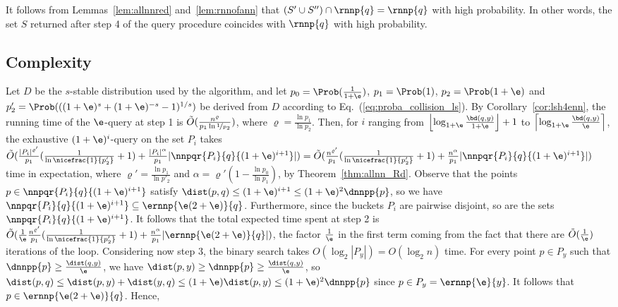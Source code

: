It follows from Lemmas~\ref{lem:allnnred} and~\ref{lem:rnnofann} that
$(S'\cup S'')\cap\rnnp{q}=\rnnp{q}$ with high probability.  In other
words, the set $S$ returned after step 4 of the query procedure
coincides with $\rnnp{q}$ with high probability.

\subsection{Complexity}
\label{rnn_complexity}

Let $D$ be the $s$-stable distribution used by the algorithm, and let
$p_0=\Prob(\frac{1}{1+\e})$, $p_1=\Prob(1)$, $p_2=\Prob(1+\e)$ and
$p'_2=\Prob(((1+\e)^s + (1+\e)^{-s} -1)^{1/s})$ be derived from $D$
according to Eq.~(\ref{eq:proba_collision_ls}). By
Corollary~\ref{cor:lsh4enn}, the running time of the $\e$-\nn query at
step 1 is $\tilde O(\frac{n^{\varrho}}{p_1 \ln \nicefrac{1}{p_2}})$,
where $\varrho = \frac{\ln p_1}{\ln p_2}$. Then, for $i$ ranging from
$\left\lfloor \log_{1+\e} \frac{\bd(q,y)}{1+\e}\right\rfloor + 1$ to
$\left\lceil \log_{1+\e}\frac{\bd(q,y)}{\e}\right\rceil$, the
exhaustive $(1+\e)^i$-\pleb query on the set $P_i$ takes $\tilde
O(\frac{|P_i|^{\varrho'}}{p_1}(\frac{1}{\ln \nicefrac{1}{p'_2}}+1) +
\frac{|P_i|^\alpha}{p_1} |\nnpqr{P_i}{q}{(1+\e)^{i+1}}|) = \tilde
O(\frac{n^{\varrho'}}{p_1}(\frac{1}{\ln \nicefrac{1}{p'_2}}+1) +
\frac{n^\alpha}{p_1} |\nnpqr{P_i}{q}{(1+\e)^{i+1}}|)$ time in
expectation, where $\varrho' = \frac{\ln p_1}{\ln p'_2}$ and $\alpha =
\varrho'(1-\frac{\ln p_0}{\ln p_1})$, by Theorem~\ref{thm:allnn_Rd}.
Observe that the points $p\in \nnpqr{P_i}{q}{(1+\e)^{i+1}}$ satisfy
$\dist(p,q)\leq (1+\e)^{i+1}\leq (1+\e)^2\dnnpp{p}$, so we have
$\nnpqr{P_i}{q}{(1+\e)^{i+1}}\subseteq
\ernnp{\e(2+\e)}{q}$. Furthermore, since the buckets $P_i$ are
pairwise disjoint, so are the sets $\nnpqr{P_i}{q}{(1+\e)^{i+1}}$. It
follows that the total expected time spent at step 2 is $\tilde
O(\frac{1}{\e}\frac{n^{\varrho'}}{p_1}(\frac{1}{\ln\nicefrac{1}{p'_2}}+1)
+ \frac{n^\alpha}{p_1}|\ernnp{\e(2+\e)}{q}|)$, the factor
$\frac{1}{\e}$ in the first term coming from the fact that there are
$\tilde O(\frac{1}{\e})$ iterations of the loop.  Considering now step
3, the binary search takes $O(\log_2 |P_y|)=O(\log_2 n)$ time.  For
every point $p\in P_y$ such that $\dnnpp{p}\geq
\frac{\dist(q,y)}{\e}$, we have $\dist(p,y)\geq \dnnpp{p}\geq
\frac{\dist(q,y)}{\e}$, so $\dist(p,q)\leq \dist(p,y)+\dist(y,q)\leq
(1+\e)\dist(p,y)\leq (1+\e)^2\dnnpp{p}$ since $p\in
P_y=\ernnp{\e}{y}$. It follows that $p\in\ernnp{\e(2+\e)}{q}$. Hence,
